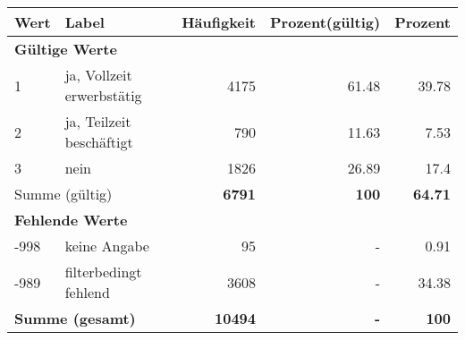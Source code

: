      \begin{longtable}{lXrrr}
     \toprule
     \textbf{Wert} & \textbf{Label} & \textbf{Häufigkeit} & \textbf{Prozent(gültig)} & \textbf{Prozent} \\
     \endhead
     \midrule
     \multicolumn{5}{l}{\textbf{Gültige Werte}}\\

     1 &
     \multicolumn{1}{X}{ ja, Vollzeit erwerbstätig   } &


       \num{4175} &
       \num[round-mode=places,round-precision=2]{61,48} &
         \num[round-mode=places,round-precision=2]{39,78} \\

     2 &
     \multicolumn{1}{X}{ ja, Teilzeit beschäftigt   } &


       \num{790} &
       \num[round-mode=places,round-precision=2]{11,63} &
         \num[round-mode=places,round-precision=2]{7,53} \\

     3 &
     \multicolumn{1}{X}{ nein   } &


       \num{1826} &
       \num[round-mode=places,round-precision=2]{26,89} &
         \num[round-mode=places,round-precision=2]{17,4} \\
     \midrule
     \multicolumn{2}{l}{Summe (gültig)} &
       \textbf{\num{6791}} &
     \textbf{100} &
       \textbf{\num[round-mode=places,round-precision=2]{64,71}} \\
     \multicolumn{5}{l}{\textbf{Fehlende Werte}}\\
       -998 &
       keine Angabe &
         \num{95} &
        - &
         \num[round-mode=places,round-precision=2]{0,91} \\
       -989 &
       filterbedingt fehlend &
         \num{3608} &
        - &
         \num[round-mode=places,round-precision=2]{34,38} \\
     \midrule
     \multicolumn{2}{l}{\textbf{Summe (gesamt)}} &
          \textbf{\num{10494}} &
        \textbf{-} &
        \textbf{100} \\
     \bottomrule
     \end{longtable}
     
